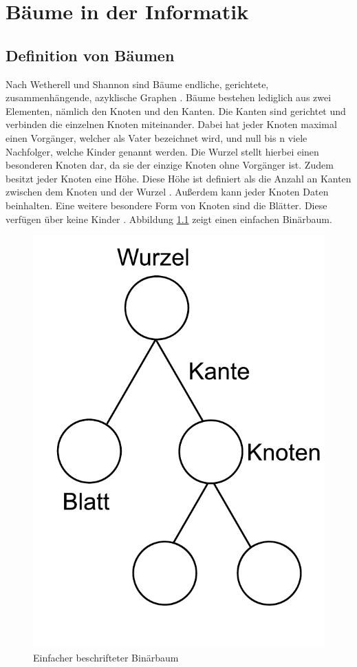 \chapter{Bäume in der Informatik}
\label{chap:kapitel2}

\section{Definition von Bäumen}

Nach Wetherell und Shannon sind Bäume endliche, gerichtete, zusammenhängende, azyklische Graphen \cite[S. 515]{q1}. 
Bäume bestehen lediglich aus zwei Elementen, nämlich den Knoten und den Kanten. Die Kanten sind gerichtet und verbinden die einzelnen 
Knoten miteinander. Dabei hat jeder Knoten maximal einen Vorgänger, welcher als Vater bezeichnet wird, und null 
bis n viele Nachfolger, welche Kinder genannt werden. Die Wurzel stellt hierbei einen besonderen Knoten dar, da sie der 
einzige Knoten ohne Vorgänger ist. Zudem besitzt jeder Knoten eine Höhe. Diese Höhe ist definiert als die Anzahl an Kanten zwischen dem
Knoten und der Wurzel \cite[S. 515]{q1}. Außerdem kann jeder Knoten Daten beinhalten. Eine weitere besondere Form von Knoten sind die Blätter. 
Diese verfügen über keine Kinder \cite[S. 4]{q4}. Abbildung \ref{pic:simple_tree} zeigt einen einfachen Binärbaum.

\begin{figure}[H]
    \centering
    \includegraphics[scale = 0.5]{abbildungen/simple_tree}
    \caption{Einfacher beschrifteter Binärbaum}
    \label{pic:simple_tree} 
\end{figure}


